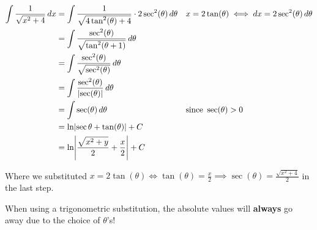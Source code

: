 \begin{Example}{}{}
    \begin{align*}
        \int \frac{1}{\sqrt{x^2+4}} \, d{x}
         & =\int \frac{1}{\sqrt{4\tan^2(\theta)+4}}\cdot 2\sec^2(\theta) \, d{\theta}
         &                                                                            & x=2\tan(\theta)\iff dx=2\sec^2(\theta)\,d\theta                               \\
         & =\int \frac{\sec^2(\theta)}{\sqrt{\tan^2(\theta+1)}} \, d{\theta}                                                                                          \\
         & =\int \frac{\sec^2(\theta)}{\sqrt{\sec^2(\theta)}} \, d{\theta}                                                                                            \\
         & =\int \frac{\sec^2(\theta)}{\abs{\sec(\theta)}} \, d{\theta}                                                                                               \\
         & =\int \sec(\theta)\, d{\theta}                                             &                                                 & \text{since }\sec(\theta)>0 \\
         & =\ln\abs{\sec{\theta}+\tan(\theta)}+C                                      &                                                                               \\
         & =\ln\abs*{\frac{\sqrt{x^2+y}}{2}+\frac{x}{2}}+C
    \end{align*}

    Where we substituted $ x=2\tan(\theta)\iff \tan(\theta)=\frac{x}{2}\implies
        \sec(\theta)=\frac{\sqrt{x^2+4}}{2} $ in the last step.
\end{Example}

\begin{Remark}{}{}
    When using a trigonometric substitution, the absolute values will \textbf{always}
    go away due to the choice of $ \theta $'s!
\end{Remark}

